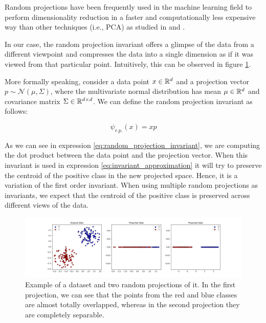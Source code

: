 Random projections have been frequently used in the machine learning field to perform dimensionality reduction
in a faster and computationally less expensive way than other techniques (i.e., PCA) as studied in 
\cite{Dasgupta2000} and \cite{BinghamManila2001}.

In our case, the random projection invariant offers a glimpse of the data from a different viewpoint
and compresses the data into a single dimension as if it was viewed from that particular point.
Intuitively, this can be observed in figure \ref{fig:random_projections_example}.

More formally speaking, consider a data point $x \in \mathbb{R}^{d}$ and a projection vector
$p \sim \mathcal{N}(\mu, \Sigma)$, where the multivariate normal distribution has mean $\mu \in \mathbb{R}^{d}$
and covariance matrix $\Sigma \in \mathbb{R}^{d \times d}$. We can define the random projection invariant as follows:

\begin{equation}
    \label{eq:random_projection_invariant}
    \psi_{r.p.}(x) = x p
\end{equation}

As we can see in expression \eqref{eq:random_projection_invariant}, we are computing the dot product between
the data point and the projection vector. When this invariant is used in expression \ref{eq:invariant_approximation}
it will try to preserve the centroid of the positive class in the new projected space. Hence, it is a variation
of the first order invariant. When using multiple random projections as invariants, we expect that the centroid
of the positive class is preserved across different views of the data.

\begin{figure}[h]
    \centering
    \includegraphics[width=\textwidth]{thesis/Figures/random_projections_example}
    \caption{Example of a dataset and two random projections of it. In the first projection, we can see
    that the points from the red and blue classes are almost totally overlapped, whereas in the second projection
    they are completely separable.}
    \label{fig:random_projections_example}
\end{figure}

